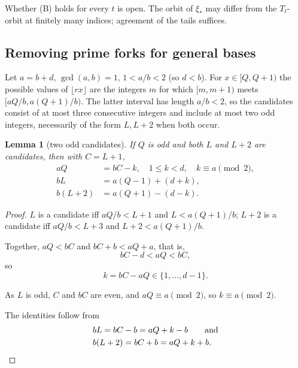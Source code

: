 \documentclass[11pt,reqno]{amsart}
\newtheorem{lemma}[theorem]{Lemma}
\theoremstyle{definition}
\theoremstyle{remark}
\begin{document}
Whether (B) holds for every \(t\) is open. The orbit of \(\xi_*\) may
differ from the \(T_t\)-orbit at finitely many indices; agreement of the
tails suffices.

\subsection{Removing prime forks for general bases}\label{sec:C.5}

Let \(a=b+d\), \(\gcd(a,b)=1\), \(1<a/b<2\) (so \(d<b\)). For
\(x\in[Q,Q+1)\) the possible values of \(\lfloor rx\rfloor\) are the
integers \(m\) for which \([m,m+1)\) meets \([aQ/b,a(Q+1)/b)\).
The latter interval has length \(a/b<2\), so the candidates consist of
at most three consecutive integers and include at most two odd integers,
necessarily of the form \(L,L+2\) when both occur.

\begin{samepage}
\begin{lemma}[two odd candidates]\leavevmode\label{thm:59}
If \(Q\) is odd and both \(L\) and
\(L+2\) are candidates, then with \(C=L+1\),
\[
\begin{aligned}
aQ&=bC-k,\quad 1\le k<d,\quad k\equiv a\pmod2,\\
bL&=a(Q-1)+(d+k),\\
b(L+2)&=a(Q+1)-(d-k).
\end{aligned}
\]
\label{thm-end:59}
\end{lemma}
\end{samepage}

\begin{proof}\leavevmode\label{proof:59}
\(L\) is a candidate iff \(aQ/b<L+1\) and \(L<a(Q+1)/b\);
\(L+2\) is a candidate iff \(aQ/b<L+3\) and \(L+2<a(Q+1)/b\).

Together,
\(aQ<bC\) and \(bC+b<aQ+a\), that is,
\[
bC-d<aQ<bC,
\]
so
\[
k=bC-aQ\in\{1,\ldots,d-1\}.
\]

As \(L\) is odd, \(C\) and \(bC\) are
even, and \(aQ\equiv a\pmod2\), so \(k\equiv a\pmod2\).

The identities
follow from
\[
\begin{aligned}
&bL=bC-b=aQ+k-b\qquad \text{and}\\
&b(L+2)=bC+b=aQ+k+b.
\end{aligned}\qedhere
\]
\end{proof}
\end{document}
